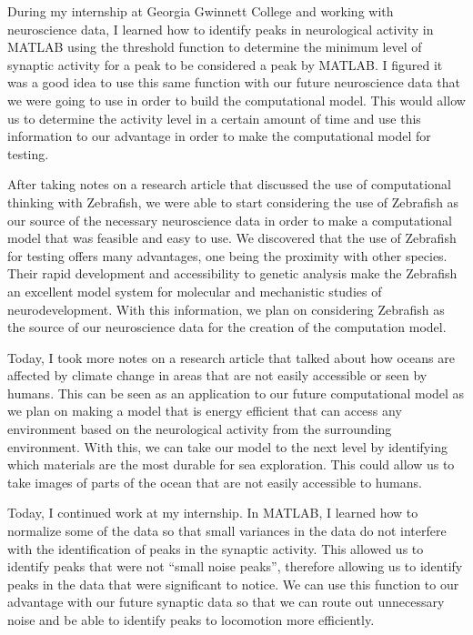 
During my internship at Georgia Gwinnett College and working with neuroscience data, I learned how to identify peaks in neurological activity in MATLAB using the threshold function to determine the minimum level of synaptic activity for a peak to be considered a peak by MATLAB. I figured it was a good idea to use this same function with our future neuroscience data that we were going to use in order to build the computational model. This would allow us to determine the activity level in a certain amount of time and use this information to our advantage in order to make the computational model for testing. 

\newpage


After taking notes on a research article that discussed the use of computational thinking with Zebrafish, we were able to start considering the use of Zebrafish as our source of the necessary neuroscience data in order to make a computational model that was feasible and easy to use. We discovered that the use of Zebrafish for testing offers many advantages, one being the proximity with other species. Their rapid development and accessibility to genetic analysis make the Zebrafish an excellent model system for molecular and mechanistic studies of neurodevelopment. With this information, we plan on considering Zebrafish as the source of our neuroscience data for the creation of the computation model. 

\newpage


Today, I took more notes on a research article that talked about how oceans are affected by climate change in areas that are not easily accessible or seen by humans. This can be seen as an application to our future computational model as we plan on making a model that is energy efficient that can access any environment based on the neurological activity from the surrounding environment. With this, we can take our model to the next level by identifying which materials are the most durable for sea exploration. This could allow us to take images of parts of the ocean that are not easily accessible to humans. 

\newpage


Today, I continued work at my internship. In MATLAB, I learned how to normalize some of the data so that small variances in the data do not interfere with the identification of peaks in the synaptic activity. This allowed us to identify peaks that were not “small noise peaks”, therefore allowing us to identify peaks in the data that were significant to notice. We can use this function to our advantage with our future synaptic data so that we can route out unnecessary noise and be able to identify peaks to locomotion more efficiently. 

